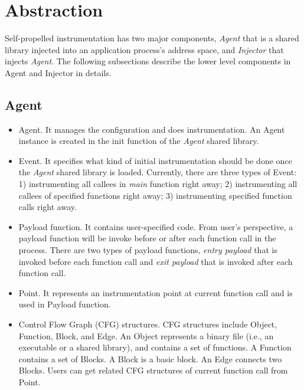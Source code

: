 \section{Abstraction}
Self-propelled instrumentation has two major components, {\em Agent} that is a
shared library injected into an application process's address space, and {\em
  Injector} that injects {\em Agent}.
The following subsections describe the lower level components in Agent and
Injector in details.

\subsection{Agent}

\begin{itemize}
\item Agent. It manages the configuration and does instrumentation. An Agent
  instance is created in the init function of the {\em Agent} shared library.
\item Event. It specifies what kind of initial instrumentation should be done
  once the {\em Agent} shared library is loaded. 
  Currently, there are three types of Event: 1) instrumenting all callees in {\em
  main} function right away; 2) instrumenting all callees of specified functions
  right away; 3) instrumenting specified function calls right away.
\item Payload function. It contains user-specified code. 
  From user's perspective, a payload function will be invoke before or after each
  function call in the process.
  There are two types of payload functions, {\em entry payload} that is invoked
  before each function call and {\em exit payload} that is invoked after each
  function call.
\item Point. It represents an instrumentation point at current function call and
  is used in Payload function.
\item Control Flow Graph (CFG) structures. CFG structures include Object,
  Function, Block, and Edge. An Object represents a binary file (i.e., an
  executable or a shared library), and contains a set of functions. A Function
  contains a set of Blocks. A Block is a basic block. An Edge connects two
  Blocks. Users can get related CFG structures of current function call from
  Point.


\end{itemize}

